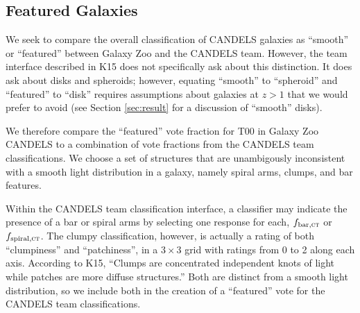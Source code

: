 \documentclass[useAMS,usenatbib]{mn2e}
\begin{document}
{%
%
%
%

%
%
%
%


\subsection{Featured Galaxies}\label{sec:compare_featured}

We seek to compare the overall classification of CANDELS galaxies as ``smooth'' or ``featured'' between Galaxy Zoo and the CANDELS team. However, the team interface described in K15 does not specifically ask about this distinction. It does ask about disks and spheroids; however, equating ``smooth'' to ``spheroid'' and ``featured'' to ``disk'' requires assumptions about galaxies at $z > 1$ that we would prefer to avoid (see Section \ref{sec:result} for a discussion of ``smooth'' disks).

We therefore compare the ``featured'' vote fraction for T00 in Galaxy Zoo CANDELS to a combination of vote fractions from the CANDELS team classifications. We choose a set of structures that are unambigously inconsistent with a smooth light distribution in a galaxy, namely spiral arms, clumps, and bar features. 

Within the CANDELS team classification interface, a classifier may indicate the presence of a bar or spiral arms by selecting one response for each, $f_{\rm bar, \textsc{ct}}$ or $f_{\rm spiral, \textsc{ct}}$. The clumpy classification, however, is actually a rating of both ``clumpiness'' and ``patchiness'', in a $3 \times 3$ grid with ratings from 0 to 2 along each axis. According to K15, ``Clumps are concentrated independent knots of light while patches are more diffuse structures.'' Both are distinct from a smooth light distribution, so we include both in the creation of a ``featured'' vote for the CANDELS team classifications.

}
\end{document}
